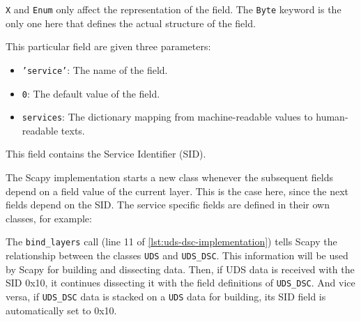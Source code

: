 \texttt{X} and \texttt{Enum} only affect the representation of the field. 
The \texttt{Byte} keyword is the only one here that defines the actual structure of the field.

This particular field are given three parameters:

\begin{itemize}
    \item \texttt{'service'}: The name of the field.
    \item \texttt{0}: The default value of the field.
    \item \texttt{services}: The dictionary mapping from machine-readable values to human-readable texts.
\end{itemize}

This field contains the Service Identifier (SID).

The Scapy implementation starts a new class whenever the subsequent fields depend on a field value of the current layer. 
This is the case here, since the next fields depend on the SID. 
The service specific fields are defined in their own classes, for example:


The \texttt{bind_layers} call (line 11 of \autoref{lst:uds-dsc-implementation}) tells Scapy the relationship between the classes \texttt{UDS} and \texttt{UDS_DSC}. 
This information will be used by Scapy for building and dissecting data.
Then, if UDS data is received with the SID 0x10, it continues dissecting it with the field definitions of \texttt{UDS_DSC}.
And vice versa, if \texttt{UDS_DSC} data is stacked on a \texttt{UDS} data for building, its SID field is automatically set to 0x10.

